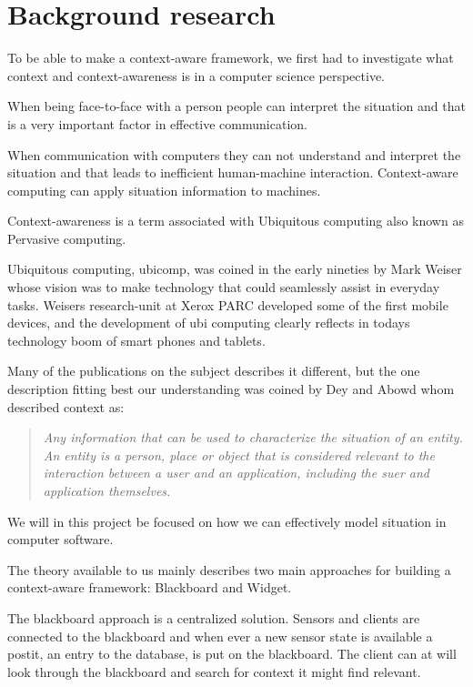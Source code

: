 \documentclass[]{report}
\begin{document}
\chapter{Background research}


To be able to make a context-aware framework, we first had to investigate what context and context-awareness is in a computer science perspective.


When being face-to-face with a person people can interpret the situation and that is a very important factor in effective communication. 

When communication with computers they can not understand and interpret the situation and that leads to inefficient human-machine interaction. Context-aware computing can apply situation information to machines.

Context-awareness is a term associated with Ubiquitous computing also known as Pervasive computing.

Ubiquitous computing, ubicomp, was coined in the early nineties by Mark Weiser whose vision was to make technology that could seamlessly assist in everyday tasks. Weisers research-unit at Xerox PARC developed some of the first mobile devices, and the development of ubi computing clearly reflects in todays technology boom of smart phones and tablets.

Many of the publications on the subject describes it different, but the one description fitting best our understanding was coined by Dey and Abowd whom described context as:


\blockquote{
	\textit{Any information that can be used to characterize the situation of an entity. An entity is a person, place or object that is considered relevant to the interaction between a user and an application, including the suer and application themselves.} \cite{Dey and Abowd (2000)} 
}

We will in this project be focused on how we can effectively model situation in computer software.

The theory available to us mainly describes two main approaches for building a context-aware framework: Blackboard and Widget.


The blackboard approach is a centralized solution. Sensors and clients are connected to the blackboard and when ever a new sensor state is available a postit, an entry to the database, is put on the blackboard. The client can at will look through the blackboard and search for context it might find relevant.
\end{document}
